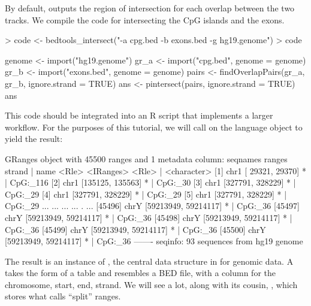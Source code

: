 \documentclass[10pt]{article}
\begin{document}
By default,  outputs the region of intersection for
each overlap between the two tracks. We compile the code for
intersecting the CpG islands and the exons.
\begin{Schunk}
\begin{Sinput}
> code <- bedtools_intersect("-a cpg.bed -b exons.bed -g hg19.genome")
> code
\end{Sinput}
\begin{Soutput}
{
    genome <- import("hg19.genome")
    gr_a <- import("cpg.bed", genome = genome)
    gr_b <- import("exons.bed", genome = genome)
    pairs <- findOverlapPairs(gr_a, gr_b, ignore.strand = TRUE)
    ans <- pintersect(pairs, ignore.strand = TRUE)
    ans
}
\end{Soutput}
\end{Schunk}
This code should be integrated into an R script that implements a
larger workflow. For the purposes of this tutorial, we will call
 on the language object to yield the result:
\begin{Schunk}
\begin{Soutput}
GRanges object with 45500 ranges and 1 metadata column:
          seqnames               ranges strand |        name
             <Rle>            <IRanges>  <Rle> | <character>
      [1]     chr1     [ 29321,  29370]      * |    CpG:_116
      [2]     chr1     [135125, 135563]      * |     CpG:_30
      [3]     chr1     [327791, 328229]      * |     CpG:_29
      [4]     chr1     [327791, 328229]      * |     CpG:_29
      [5]     chr1     [327791, 328229]      * |     CpG:_29
      ...      ...                  ...    ... .         ...
  [45496]     chrY [59213949, 59214117]      * |     CpG:_36
  [45497]     chrY [59213949, 59214117]      * |     CpG:_36
  [45498]     chrY [59213949, 59214117]      * |     CpG:_36
  [45499]     chrY [59213949, 59214117]      * |     CpG:_36
  [45500]     chrY [59213949, 59214117]      * |     CpG:_36
  -------
  seqinfo: 93 sequences from hg19 genome
\end{Soutput}
\end{Schunk}
%
The result is an instance of , the central data
structure in \Bioconductor{} for genomic data.  A 
takes the form of a table and resembles a BED file, with a column for
the chromosome, start, end, strand.  We will see  a
lot, along with its cousin, , which stores what
 calls ``split'' ranges.
\end{document}
